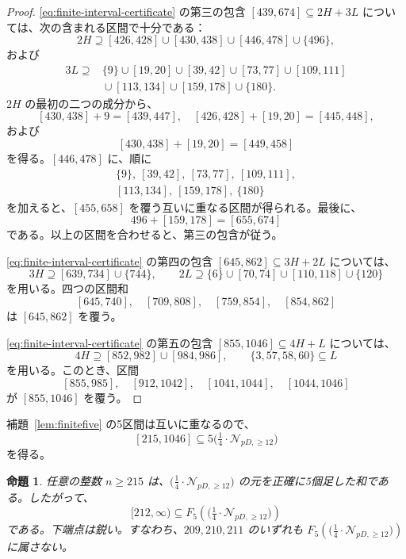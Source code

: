 \documentclass[12pt]{ltjsarticle}
\theoremstyle{plain}
\newtheorem{proposition}[theorem]{命題}
\theoremstyle{definition}
\theoremstyle{plain}
\newcommand{\Pset}{
  \bigl(\tfrac{1}{4}\cdot\mathcal{N}_{pD,\geq 12}\bigr)
}
\begin{document}
\begin{proof}
\eqref{eq:finite-interval-certificate} の第三の包含 $[439,674]\subseteq2H+3L$ については、次の含まれる区間で十分である：
\[
 2H\supseteq[426,428]\cup[430,438]\cup[446,478]\cup\{496\},
\]
および
\[
\begin{split}
3L\supseteq{}&\{9\}\cup[19,20]\cup[39,42]\cup[73,77]
 \cup[109,111]\\
 &{}\cup[113,134]\cup[159,178]\cup\{180\}.
\end{split}
\]
$2H$ の最初の二つの成分から、
\[
 [430,438]+9=[439,447],\quad
 [426,428]+[19,20]=[445,448],
\]
および
\[
 [430,438]+[19,20]=[449,458]
\]
を得る。$[446,478]$ に、順に
\[
\begin{gathered}
 \{9\},\ [39,42],\ [73,77],\ [109,111],\\
 [113,134],\ [159,178],\ \{180\}
\end{gathered}
\]
を加えると、$[455,658]$ を覆う互いに重なる区間が得られる。最後に、
\[
 496+[159,178]=[655,674]
\]
である。以上の区間を合わせると、第三の包含が従う。

\eqref{eq:finite-interval-certificate} の第四の包含 $[645,862]\subseteq3H+2L$ については、
\[
 3H\supseteq[639,734]\cup\{744\},\qquad
 2L\supseteq\{6\}\cup[70,74]\cup[110,118]\cup\{120\}
\]
を用いる。四つの区間和
\[
 [645,740],\quad[709,808],\quad[759,854],\quad[854,862]
\]
は $[645,862]$ を覆う。

\eqref{eq:finite-interval-certificate} の第五の包含 $[855,1046]\subseteq4H+L$ については、
\[
 4H\supseteq[852,982]\cup[984,986],
 \qquad \{3,57,58,60\}\subseteq L
\]
を用いる。このとき、区間
\[
 [855,985],\quad[912,1042],\quad[1041,1044],\quad[1044,1046]
\]
が $[855,1046]$ を覆う。
\end{proof}

補題~\ref{lem:finitefive} の5区間は互いに重なるので、
\[
 [215,1046]\subseteq5\Pset
\]
を得る。

\begin{proposition}\label{prop:fiveP}
任意の整数 $n\geq215$ は、$\Pset$ の元を正確に5個足した和である。したがって、
\[
 [212,\infty)\subseteq F_5(\Pset)
\]
である。下端点は鋭い。すなわち、$209,210,211$ のいずれも $F_5(\Pset)$ に属さない。
\end{proposition}
\end{document}
